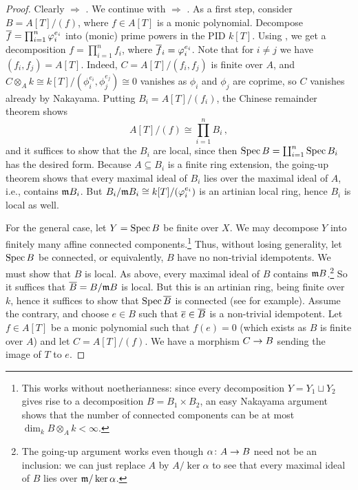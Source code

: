 \begin{proof}
	Clearly  $\Rightarrow$ . We continue with  $\Rightarrow$ . As a first step, consider $B=A[T]/(f)$, where $f\in A[T]$ is a monic polynomial. Decompose $\ov{f}=\prod_{i=1}^n\phi_i^{e_i}$ into (monic) prime powers in the PID $k[T]$. Using , we get a decomposition $f=\prod_{i=1}^nf_i$, where $\ov{f}_i=\phi_i^{e_i}$. Note that for $i\neq j$ we have $(f_i,f_j)=A[T]$. Indeed, $C=A[T]/(f_i,f_j)$ is finite over $A$, and $C\otimes_Ak\cong k[T]/(\phi_i^{e_i},\phi_j^{e_j})\cong 0$ vanishes as $\phi_i$ and $\phi_j$ are coprime, so $C$ vanishes already by Nakayama. Putting $B_i=A[T]/(f_i)$, the Chinese remainder theorem shows
	\begin{equation*}
		A[T]/(f)\cong\prod_{i=1}^nB_i\,,
	\end{equation*}
	and it suffices to show that the $B_i$ are local, since then $\operatorname{Spec} B=\coprod_{i=1}^n\operatorname{Spec} B_i$ has the desired form. Because $A\subseteq B_i$ is a finite ring extension, the going-up theorem shows that every maximal ideal of $B_i$ lies over the maximal ideal of $A$, i.e., contains $\mathfrak{m} B_i$. But $B_i/\mathfrak{m} B_i\cong k[T]/(\varphi_i^{e_i})$ is an artinian local ring, hence $B_i$ is local as well.
	
	For the general case, let $Y=\operatorname{Spec} B$ be finite over $X$. We may decompose $Y$ into finitely many affine connected components.\footnote{This works without noetherianness: since every decomposition $Y=Y_1\sqcup Y_2$ gives rise to a decomposition $B=B_1\times B_2$, an easy Nakayama argument shows that the number of connected components can be at most $\dim_kB\otimes_Ak<\infty$.} Thus, without losing generality, let $\operatorname{Spec} B$ be connected, or equivalently, $B$ have no non-trivial idempotents. We must show that $B$ is local. As above, every maximal ideal of $B$ contains $\mathfrak{m} B$.\footnote{\label{footnote:going-up}The going-up argument works even though $\alpha\colon A\morphism B$ need not be an inclusion: we can just replace $A$ by $A/\ker\alpha$ to see that every maximal ideal of $B$ lies over $\mathfrak{m}/\ker\alpha$.} So it suffices that $\ov{B}=B/\mm B$ is local. But this is an artinian ring, being finite over $k$, hence it suffices to show that $\Spec \ov{B}$ is connected (see \cite[Corollary~2.16]{eisenbudCommAlg} for example). Assume the contrary, and choose $e\in B$ such that $\ov{e}\in\ov{B}$ is a non-trivial idempotent. Let $f\in A[T]$ be a monic polynomial such that $f(e)=0$ (which exists as $B$ is finite over $A$) and let $C=A[T]/(f)$. We have a morphism $C\morphism B$ sending the image of $T$ to $e$. 
	

\end{proof}

